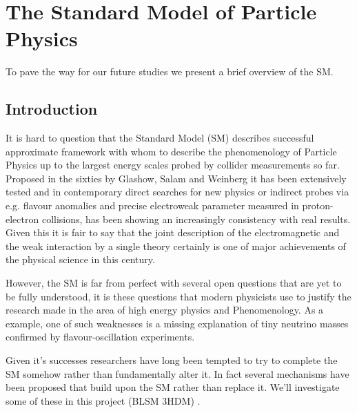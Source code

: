 
\newpage 

\section{The Standard Model of Particle Physics}

To pave the way for our future studies we present a brief overview of the SM. 

\subsection{Introduction}

It is hard to question that the Standard Model (SM) describes successful approximate framework with whom to describe the phenomenology of Particle Physics up to the largest energy scales probed by collider measurements so far. Proposed in the sixties by Glashow, Salam and Weinberg it has been extensively tested and in contemporary direct searches for new physics or indirect probes via e.g. flavour anomalies and precise electroweak parameter measured in proton-electron collisions, has been showing an increasingly consistency with real results.  %
Given this it is fair to say that the joint description of the  electromagnetic and the  weak  interaction  by  a  single  theory  certainly  is  one  of  major  achievements  of the physical science in this century. 

However, the SM  is far from perfect with several open questions that are yet to be fully understood, it is these questions that modern physicists use to justify the research made in the area of high energy physics and Phenomenology. As a example, one of such weaknesses is a missing explanation of tiny neutrino masses confirmed by flavour-oscillation experiments. 

Given it's successes researchers have long been tempted to try to complete the SM somehow rather than fundamentally alter it. In fact several mechanisms have been proposed that build upon the SM rather than replace it. { \color{blue}  We'll investigate some of these in this project (BLSM 3HDM) . } 

